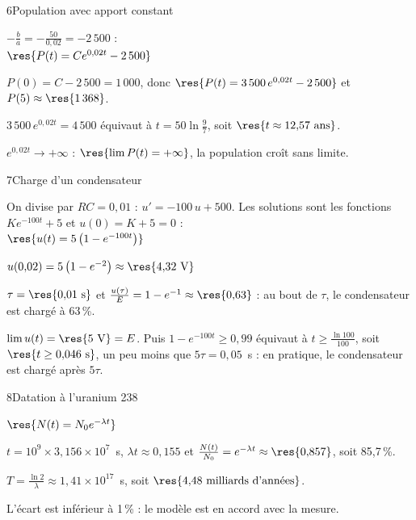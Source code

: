 \begin{deuxcolonnes}
\begin{corrige}{6}{Population avec apport constant}
\begin{questions}
  \item $-\frac ba=-\frac{50}{0{,}02}=-2\,500$ :\\ $\res{P(t)=Ce^{0{,}02t}-2\,500}$
  \item $P(0)=C-2\,500=1\,000$, donc $\res{P(t)=3\,500\,e^{0{,}02t}-2\,500}$ et $P(5)\approx\res{1\,368}$.
  \item $3\,500\,e^{0{,}02t}=4\,500$ équivaut à $t=50\ln\frac97$, soit $\res{t\approx12{,}57\text{ ans}}$.
  \item $e^{0{,}02t}\to+\infty$ : $\res{\lim P(t)=+\infty}$, la population croît sans limite.
\end{questions}
\end{corrige}

\begin{corrige}{7}{Charge d'un condensateur}
\begin{questions}
  \item On divise par $RC=0{,}01$ : $u'=-100\,u+500$. Les solutions sont les fonctions $Ke^{-100t}+5$ et $u(0)=K+5=0$ :\\
    $\res{u(t)=5\left(1-e^{-100t}\right)}$
  \item $u(0{,}02)=5\left(1-e^{-2}\right)\approx\res{4{,}32\text{ V}}$
  \item $\tau=\res{0{,}01\text{ s}}$ et $\frac{u(\tau)}{E}=1-e^{-1}\approx\res{0{,}63}$ : au bout de $\tau$, le condensateur est chargé à 63\,\%.
  \item $\lim u(t)=\res{5\text{ V}}=E$. Puis $1-e^{-100t}\geq0{,}99$ équivaut à $t\geq\frac{\ln100}{100}$, soit $\res{t\geq0{,}046\text{ s}}$, un peu moins
    que $5\tau=0{,}05$~s : en pratique, le condensateur est chargé après $5\tau$.
\end{questions}
\end{corrige}

\begin{corrige}{8}{Datation à l'uranium 238}
\begin{questions}
  \item $\res{N(t)=N_0e^{-\lambda t}}$
  \item $t=10^{9}\times3{,}156\times10^{7}$~s, $\lambda t\approx0{,}155$ et $\frac{N(t)}{N_0}=e^{-\lambda t}\approx\res{0{,}857}$, soit 85,7\,\%.
  \item $T=\frac{\ln2}{\lambda}\approx1{,}41\times10^{17}$~s, soit $\res{4{,}48\text{ milliards d'années}}$.
  \item L'écart est inférieur à 1\,\% : le modèle est en accord avec la mesure.
\end{questions}
\end{corrige}

\end{deuxcolonnes}

